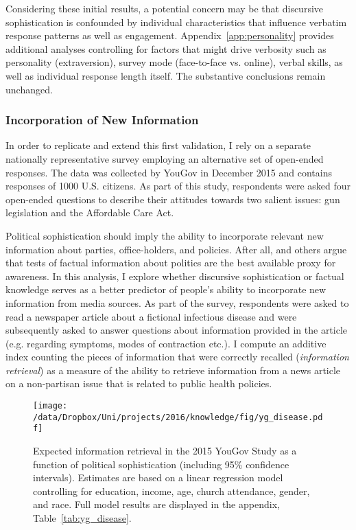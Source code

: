 Considering these initial results, a potential concern may be that discursive sophistication is confounded by individual characteristics that influence verbatim response patterns as well as engagement. Appendix~\ref{app:personality} provides additional analyses controlling for factors that might drive verbosity such as personality (extraversion), survey mode (face-to-face vs. online), verbal skills, as well as individual response length itself. The substantive conclusions remain unchanged.


\subsubsection*{Incorporation of New Information}
In order to replicate and extend this first validation, I rely on a separate nationally representative survey employing an alternative set of open-ended responses. The data was collected by YouGov in December 2015 and contains responses of 1000 U.S. citizens. %
As part of this study, respondents were asked four open-ended questions to describe their attitudes towards two salient issues: gun legislation and the Affordable Care Act.


Political sophistication should imply the ability to incorporate relevant new information about parties, office-holders, and policies. After all,  \citet{zaller1990political,zaller1992nature} and others argue that tests of factual information about politics are the best available proxy for awareness. In this analysis, I explore whether discursive sophistication or factual knowledge serves as a better predictor of people's ability to incorporate new information from media sources. As part of the survey, respondents were asked to read a newspaper article about a fictional infectious disease and were subsequently asked to answer questions about information provided in the article (e.g. regarding symptoms, modes of contraction etc.). I compute an additive index counting the pieces of information that were correctly recalled (\textit{information retrieval}) as a measure of the ability to retrieve information from a news article on a non-partisan issue that is related to public health policies. 

\begin{figure}[h]\centering
\texttt{[image: /data/Dropbox/Uni/projects/2016/knowledge/fig/yg\_disease.pdf]}
\caption[Expected information retrieval in the 2015 YouGov Study as a function of political sophistication]{Expected information retrieval in the 2015 YouGov Study as a function of political sophistication (including 95\% confidence intervals). Estimates are based on a linear regression model controlling for education, income, age, church attendance, gender, and race. Full model results are displayed in the appendix, Table~\ref{tab:yg_disease}.}\label{fig:yg_disease}
\end{figure}

